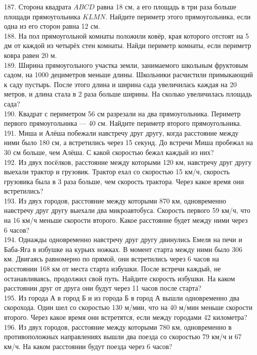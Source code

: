 \documentclass[12pt]{article}
\begin{document}
187. Сторона квадрата $ABCD$ равна 18 см, а его площадь в три раза больше площади прямоугольника $KLMN.$ Найдите периметр этого прямоугольника, если одна из его сторон равна 12 см.\\
188. На пол прямоугольной комнаты положили ковёр, края которого отстоят на  5 дм от каждой из четырёх стен комнаты. Найди периметр комнаты, если периметр ковра равен 20 м.\\
189.  Ширина прямоугольного участка земли, занимаемого школьным фруктовым садом, на 1000 дециметров меньше длины. Школьники расчистили примыкающий к саду пустырь. После этого длина и ширина сада увеличилась каждая на 20 метров, и длина стала в 2 раза больше ширины. На сколько увеличилась площадь сада?\\
190.  Квадрат с периметром 56 см разрезали на два прямоугольника. Периметр первого прямоугольника --- 40 см. Найдите периметр второго прямоугольника.\\
191. Миша и Алёша побежали  навстречу друг другу, когда расстояние между ними было 180 см, а встретились через 15 секунд. До встречи Миша пробежал на 30 см больше, чем Алёша. С какой скоростью бежал каждый из них?\\
192. Из двух посёлков, расстояние между которыми 120 км, навстречу друг другу выехали трактор и грузовик. Трактор ехал со скоростью 15 км/ч, скорость грузовика была в 3 раза больше, чем скорость трактора. Через какое время они встретились?\\
193. Из двух городов, расстояние между которыми  870 км, одновременно навстречу друг другу выехали два микроавтобуса. Скорость первого 59 км/ч, что на 16 км/ч меньше скорости второго. Какое расстояние будет между ними через 6 часов?\\
194. Однажды одновременно навстречу друг другу двинулись Емеля на печи и Баба-Яга в избушке на курьих ножках. В момент старта между ними было 306 км. Двигаясь равномерно по прямой, они встретились через 6 часов на расстоянии 168 км от места старта избушки. После встречи каждый, не останавливаясь, продолжил свой путь. Найдите скорость избушки. На каком расстоянии друг от друга они будут через 11 часов после старта?\\
195. Из города А в город Б и из города Б в город А вышли одновременно два скорохода. Один шел со скоростью 130 м/мин, что на 40 м/мин меньше скорости второго. Через какое время они встретятся, если между городами 42 километра?\\
196. Из двух городов, расстояние между которыми 780 км, одновременно в противоположных направлениях вышли два поезда со скоростью 79 км/ч и 67 км/ч. На каком расстоянии будут поезда через 6 часов?\\
\end{document}
